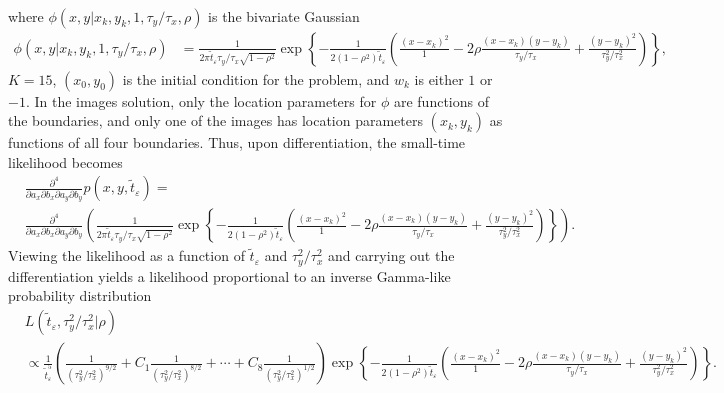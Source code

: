 \documentclass[10pt]{article}
\begin{document}
\begin{enumerate}
\begin{align}
  \end{align}
  where $\phi(x,y | x_k, y_k, 1, \tau_y/\tau_x, \rho)$ is the
  bivariate Gaussian
  \begin{align}
    \phi(x,y | x_k, y_k, 1, \tau_y/\tau_x, \rho) &= \frac{1}{2\pi \tilde{t}_\varepsilon \tau_y/\tau_x \sqrt{1-\rho^2}}  \exp\left\{ -\frac{1}{2(1-\rho^2)\tilde{t}_\varepsilon} \left( \frac{(x - x_k)^2}{1} - 2\rho \frac{(x-x_k)(y-y_k)}{\tau_y/\tau_x} +  \frac{(y - y_k)^2}{\tau_y^2/\tau_x^2}  \right)  \right\},
  \end{align}
  $K=15$, $(x_0, y_0)$ is the initial condition for the problem, and
  $w_k$ is either $1$ or $-1$. In the images solution, only the
  location parameters for $\phi$ are functions of the boundaries, and
  only one of the images has location parameters $(x_k, y_k)$ as functions of all four
  boundaries. Thus, upon differentiation, the small-time likelihood
  becomes
    \begin{align}
      &\frac{\partial^4}{\partial a_x \partial b_x \partial a_y \partial b_y}p(x,y,\tilde{t}_\varepsilon) = \nonumber \\
      &\frac{\partial^4}{\partial a_x \partial b_x \partial a_y \partial b_y} \left( \frac{1}{2\pi \tilde{t}_\varepsilon \tau_y/\tau_x \sqrt{1-\rho^2}}  \exp\left\{ -\frac{1}{2(1-\rho^2)\tilde{t}_\varepsilon} \left( \frac{(x - x_k)^2}{1} - 2\rho \frac{(x-x_k)(y-y_k)}{\tau_y/\tau_x} +  \frac{(y - y_k)^2}{\tau_y^2/\tau_x^2}  \right)  \right\} \right).
    \end{align}
    Viewing the likelihood as a function of $\tilde{t}_\varepsilon$
    and $\tau_y^2/\tau_x^2$ and carrying out the differentiation
    yields a likelihood proportional to an inverse Gamma-like
    probability distribution
    \begin{align}
      &L(\tilde{t}_\varepsilon, \tau_y^2/\tau_x^2 | \rho) \nonumber \\
      &\propto \frac{1}{\tilde{t}_\varepsilon^5}\left(\frac{1}{(\tau_y^2/\tau_x^2)^{9/2}} + C_1 \frac{1}{(\tau_y^2/\tau_x^2)^{8/2}} + \cdots + C_8 \frac{1}{(\tau_y^2/\tau_x^2)^{1/2}} \right) \exp\left\{ -\frac{1}{2(1-\rho^2)\tilde{t}_\varepsilon} \left( \frac{(x - x_k)^2}{1} - 2\rho \frac{(x-x_k)(y-y_k)}{\tau_y/\tau_x} +  \frac{(y - y_k)^2}{\tau_y^2/\tau_x^2}  \right)  \right\} . \label{eq:inv-Gam-likelihood}
    \end{align}


\end{enumerate}
\end{document}
